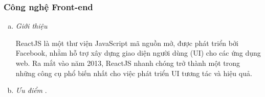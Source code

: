 \subsubsection{Công nghệ Front-end}

\begin{enumerate}[(a)]
	\item \textit{Giới thiệu}

	      ReactJS là một thư viện JavaScript mã nguồn mở, được phát triển bởi Facebook, nhằm hỗ trợ xây dựng giao diện người dùng (UI) cho các ứng dụng web. Ra mắt vào năm 2013, ReactJS nhanh chóng trở thành một trong những công cụ phổ biến nhất cho việc phát triển UI tương tác và hiệu quả.




	\item \textit{Ưu điểm} \cite{React}.


\end{enumerate}
